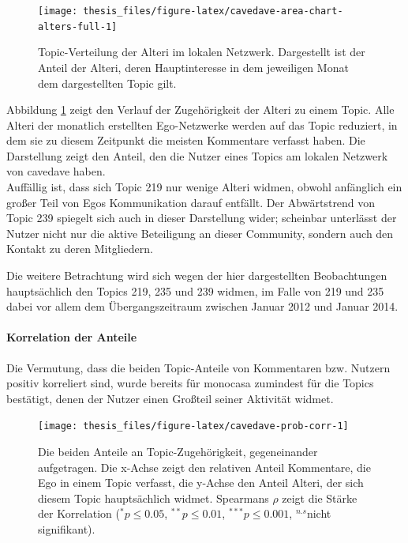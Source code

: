 \documentclass[11pt,a4paper,twoside]{article}
\let\oldpar\paragraph
\renewcommand{\paragraph}{\oldpar*}
\begin{document}
\begin{figure}

{\centering \texttt{[image: thesis\_files/figure-latex/cavedave-area-chart-alters-full-1]} 

}

\caption{Topic-Verteilung der Alteri im
lokalen Netzwerk. Dargestellt ist der Anteil der Alteri, deren
Hauptinteresse in dem jeweiligen Monat dem dargestellten Topic gilt.}\label{fig:cavedave-area-chart-alters-full}
\end{figure}

Abbildung \ref{fig:cavedave-area-chart-alters-full} zeigt den Verlauf
der Zugehörigkeit der Alteri zu einem Topic. Alle Alteri der monatlich
erstellten Ego-Netzwerke werden auf das Topic reduziert, in dem sie zu
diesem Zeitpunkt die meisten Kommentare verfasst haben. Die Darstellung
zeigt den Anteil, den die Nutzer eines Topics am lokalen Netzwerk von
cavedave haben.\\
Auffällig ist, dass sich Topic 219 nur wenige Alteri widmen, obwohl
anfänglich ein großer Teil von Egos Kommunikation darauf entfällt. Der
Abwärtstrend von Topic 239 spiegelt sich auch in dieser Darstellung
wider; scheinbar unterlässt der Nutzer nicht nur die aktive Beteiligung
an dieser Community, sondern auch den Kontakt zu deren Mitgliedern.

Die weitere Betrachtung wird sich wegen der hier dargestellten
Beobachtungen hauptsächlich den Topics 219, 235 und 239 widmen, im Falle
von 219 und 235 dabei vor allem dem Übergangszeitraum zwischen Januar
2012 und Januar 2014.

\hypertarget{korrelation-der-anteile}{%
\paragraph{Korrelation der Anteile}\label{korrelation-der-anteile}}

Die Vermutung, dass die beiden Topic-Anteile von Kommentaren bzw.
Nutzern positiv korreliert sind, wurde bereits für monocasa zumindest
für die Topics bestätigt, denen der Nutzer einen Großteil seiner
Aktivität widmet.








\begin{figure}

{\centering \texttt{[image: thesis\_files/figure-latex/cavedave-prob-corr-1]} 

}

\caption{Die beiden Anteile an Topic-Zugehörigkeit,
gegeneinander aufgetragen. Die x-Achse zeigt den relativen Anteil
Kommentare, die Ego in einem Topic verfasst, die y-Achse den Anteil
Alteri, der sich diesem Topic hauptsächlich widmet. Spearmans \(\rho\)
zeigt die Stärke der Korrelation (\(^{*}p\le0.05\), \(^{**}p\le0.01\),
\(^{***}p\le0.001\), \(^{n.s}\)nicht signifikant).}\label{fig:cavedave-prob-corr}
\end{figure}
\end{document}
